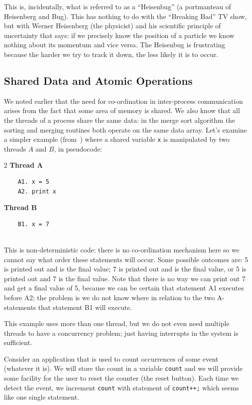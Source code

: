 This is, incidentally, what is referred to as a ``Heisenbug'' (a portmanteau of Heisenberg and Bug). This has nothing to do with the ``Breaking Bad'' TV show, but with Werner Heisenberg (the physicist) and his scientific principle of uncertainty that says: if we precisely know the position of a particle we know nothing about its momentum and vice versa. The Heisenbug is frustrating because the harder we try to track it down, the less likely it is to occur.


\subsection*{Shared Data and Atomic Operations}
We noted earlier that the need for co-ordination in inter-process communication arises from the fact that some area of memory is shared. We also know that all the threads of a process share the same data: in the merge sort algorithm the sorting and merging routines both operate on the same data array. Let's examine a simpler example (from~\cite{lbs}) where a shared variable \texttt{x} is manipulated by two threads $A$ and $B$, in pseudocode:

\begin{multicols}{2}
	\textbf{Thread A}\vspace{-2em}
	\begin{verbatim}
	A1. x = 5
	A2. print x
	\end{verbatim}
	\columnbreak
	\textbf{Thread B}\vspace{-2em}
	\begin{verbatim}
	B1. x = 7
	
	\end{verbatim}
\end{multicols}

This is non-deterministic code: there is no co-ordination mechanism here so we cannot say what order these statements will occur. Some possible outcomes are: 5 is printed out and is the final value; 7 is printed out and is the final value, or 5 is printed out and 7 is the final value. Note that there is no way we can print out 7 and get a final value of 5, because we can be certain that statement A1 executes before A2; the problem is we do not know where in relation to the two A-statements that statement B1 will execute.

This example uses more than one thread, but we do not even need multiple threads to have a concurrency problem; just having interrupts in the system is sufficient.

Consider an application that is used to count occurrences of some event (whatever it is). We will store the count in a variable \texttt{count} and we will provide some facility for the user to reset the counter (the reset button). Each time we detect the event, we increment \texttt{count} with statement of \texttt{count++;} which seems like one single statement.


